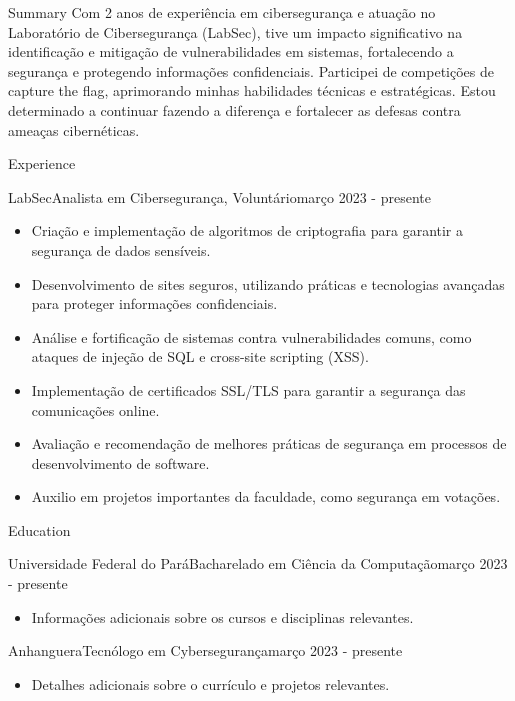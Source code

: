 \documentclass[]{mcdowellcv}
\begin{document}
\makeheader

\begin{cvsection}{Summary}
        \vspace{\baselineskip}
	Com 2 anos de experiência em cibersegurança e atuação no Laboratório de Cibersegurança (LabSec), tive um impacto significativo na identificação e mitigação de vulnerabilidades em sistemas, fortalecendo a segurança e protegendo informações confidenciais. Participei de competições de capture the flag, aprimorando minhas habilidades técnicas e estratégicas. Estou determinado a continuar fazendo a diferença e fortalecer as defesas contra ameaças cibernéticas.
\end{cvsection}

\begin{cvsection}{Experience}
	\begin{cvsubsection}{LabSec}{Analista em Cibersegurança, Voluntário}{março 2023 - presente}
		\begin{itemize}
                \vspace{\baselineskip}
                \item Criação e implementação de algoritmos de criptografia para garantir a segurança de dados sensíveis.
			\item Desenvolvimento de sites seguros, utilizando práticas e tecnologias avançadas para proteger informações confidenciais.
			\item Análise e fortificação de sistemas contra vulnerabilidades comuns, como ataques de injeção de SQL e cross-site scripting (XSS).
			\item Implementação de certificados SSL/TLS para garantir a segurança das comunicações online.
			\item Avaliação e recomendação de melhores práticas de segurança em processos de desenvolvimento de software.
			\item Auxilio em projetos importantes da faculdade, como segurança em votações.
		\end{itemize}
	\end{cvsubsection}
\end{cvsection}

\begin{cvsection}{Education}
	\begin{cvsubsection}{Universidade Federal do Pará}{Bacharelado em Ciência da Computação}{março 2023 - presente}
		\begin{itemize}
                \vspace{\baselineskip}
			\item Informações adicionais sobre os cursos e disciplinas relevantes.
		\end{itemize}
	\end{cvsubsection}
	\begin{cvsubsection}{Anhanguera}{Tecnólogo em Cybersegurança}{março 2023 - presente}
		\begin{itemize}
			\item Detalhes adicionais sobre o currículo e projetos relevantes.
		\end{itemize}
	\end{cvsubsection}
\end{cvsection}
\end{document}
